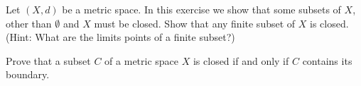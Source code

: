 \item Let $(X,d)$ be a metric space. In this exercise we show that some subsets of $X$, other than $\emptyset$ and $X$ must be closed. Show that any finite subset of $X$ is closed. (Hint: What are the limits points of a finite subset?)

\begin{comment}

\ExerciseSolution Let $(X,d)$ be a metric space and let $A$ be a finite subset of $X$. Let $a \in A$. Since $A$ is finite, label the other elements of $A$ as $a_1$, $a_2$, $\ldots$, $a_n$. Let $\epsilon = \min\{d(a,a_k) \mid 1 \leq k \leq n\}$. The fact that $A$ is finite means that $\epsilon$ is positive. Since $d(a,a_k) \geq \epsilon$ for each $k$ between $1$ and $n$, it follows that $B(a,\epsilon) =\{a\}$. This means that $a$ cannot be a limit point of $A$, since this neighborhood of $a$ contains no points in $A$ different than $a$. Thus, $A$ has no limit points and so contains all of its limit points. We conclude that $A$ is closed. 

\end{comment}

\item \label{ex:closed_bounded} Prove that a subset $C$ of a metric space $X$ is closed if and only if $C$ contains its boundary. 

\begin{comment}

\ExerciseSolution Let $X$ be a metric space, and let $C$ be a subset of $X$. First we assume that $C$ is closed and show that $C$ contains its boundary. Let $x \in X$ be a boundary point of $C$. We proceed by contradiction and assume that $x \notin C$. Then $x \in X \setminus C$, which is an open set. This implies that there is an $\epsilon > 0$ so that $B(x, \epsilon) \subseteq X \setminus C$. But then this neighborhood $B(x, \epsilon)$ contains no points in $C$, which contradicts the fact that $x$ is a boundary point of $C$. We conclude that $x \in C$ and $C$ contains its boundary.

For the converse, assume that $C$ contains its boundary. To show that $C$ is closed, we prove that $X \setminus C$ is open. We again proceed by contradiction and assume that $X \setminus C$ is not open. Then there exists $x \in X \setminus C$ such that no neighborhood of $x$ is entirely contained in $X \setminus C$. This implies that every neighborhood of $x$ contains a point in $C$. Since $x \in X \setminus C$, we have that $x \notin C$. So every neighborhood of $x$ contains a point in $C$ and a point in $X \setminus C$. Thus, $x$ is a boundary point of $C$. It follows that $x \in C$, contradicting the fact that $x \in X \setminus C$. We conclude that $X \setminus C$ is open and $C$ is closed.

\end{comment}

